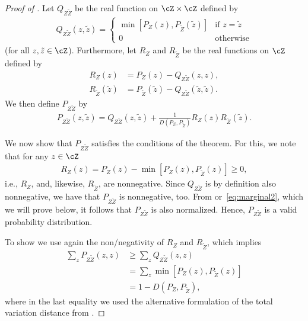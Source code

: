 \begin{proof}[Proof of ]
  Let $Q_{Z \tilde{Z}}$ be the real function on $\cZ \times \cZ$
  defined by
  \begin{align*}
    Q_{Z \tilde{Z}}(z,\tilde{z}) = \begin{cases} \min[P_Z(z),
      P_{\tilde{Z}}(\tilde{z})] & \text{if $z=\tilde{z}$} \\ 0 & \text{otherwise}\end{cases} 
  \end{align*}
  (for all $z, \tilde{z} \in \cZ$).  Furthermore, let $R_Z$ and
  $R_{\tilde{Z}}$ be the real functions on $\cZ$ defined by
  \begin{align*}
    R_Z(z) & = P_Z(z) - Q_{Z \tilde{Z}}(z, z) , \\
    R_{\tilde{Z}}(\tilde{z}) & = P_{\tilde{Z}}(\tilde{z}) - Q_{Z
        \tilde{Z}}(\tilde{z}, \tilde{z})  .
  \end{align*}
  We then define $P_{Z \tilde{Z}}$ by
  \begin{align*}
    P_{Z \tilde{Z}}(z, \tilde{z}) = Q_{Z \tilde{Z}}(z, \tilde{z}) +
    \frac{1}{D(P_Z, P_{\tilde{Z}})} R_Z(z) R_{\tilde{Z}}(\tilde{z}) .
  \end{align*}
   
  We now show that $P_{Z \tilde{Z}}$ satisfies the conditions of the
  theorem. For this, we note that for any $z \in \cZ$
  \begin{align*}
    R_Z(z) = P_Z(z) - \min[P_Z(z), P_{\tilde{Z}}(z)] \geq 0, 
  \end{align*}
  i.e., $R_Z$, and, likewise, $R_{\tilde{Z}}$, are nonnegative. Since
  $Q_{Z \tilde{Z}}$ is by definition also nonnegative, we have that
  $P_{Z \tilde{Z}}$ is nonnegative, too. From 
  or~\eqref{eq:marginal2}, which we will prove below, it follows that
  $P_{Z \tilde{Z}}$ is also normalized. Hence, $P_{Z \tilde{Z}}$ is a
  valid probability distribution.

  To show  we use again the non\-/negativity
  of $R_{Z}$ and $R_{\tilde{Z}}$, which implies
  \begin{align*}
    \sum_z P_{Z \tilde{Z}}(z,z) & \geq \sum_z Q_{Z \tilde{Z}}(z,z) \\
    & = \sum_z \min[P_Z(z), P_{\tilde{Z}}(z)] \\
    & = 1- D(P_Z, P_{\tilde{Z}}) ,
  \end{align*}
  where in the last equality we used the alternative formulation of the
  total variation distance from .


\end{proof}
